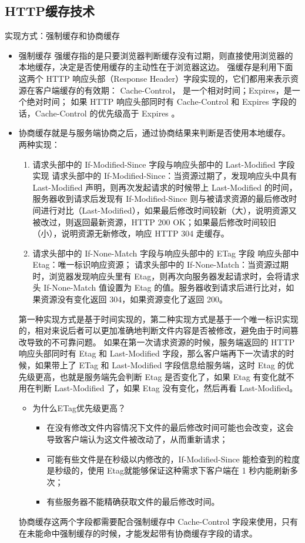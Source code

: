 \documentclass[11pt]{article}
\begin{document}
\subsection{HTTP缓存技术}
\label{sec:org32c3429}
实现方式：强制缓存和协商缓存
\begin{itemize}
\item 强制缓存
强缓存指的是只要浏览器判断缓存没有过期，则直接使用浏览器的本地缓存，决定是否使用缓存的主动性在于浏览器这边。
强缓存是利用下面这两个 HTTP 响应头部（Response Header）字段实现的，它们都用来表示资源在客户端缓存的有效期：
Cache-Control， 是一个相对时间；Expires，是一个绝对时间；
如果 HTTP 响应头部同时有 Cache-Control 和 Expires 字段的话，Cache-Control 的优先级高于 Expires 。

\item 协商缓存就是与服务端协商之后，通过协商结果来判断是否使用本地缓存。
两种实现：
\begin{enumerate}
\item 请求头部中的 If-Modified-Since 字段与响应头部中的 Last-Modified 字段实现
请求头部中的 If-Modified-Since：当资源过期了，发现响应头中具有 Last-Modified 声明，则再次发起请求的时候带上 Last-Modified 的时间，服务器收到请求后发现有 If-Modified-Since 则与被请求资源的最后修改时间进行对比（Last-Modified），如果最后修改时间较新（大），说明资源又被改过，则返回最新资源，HTTP 200 OK；如果最后修改时间较旧（小），说明资源无新修改，响应 HTTP 304 走缓存。

\item 请求头部中的 If-None-Match 字段与响应头部中的 ETag 字段
响应头部中 Etag：唯一标识响应资源；
请求头部中的 If-None-Match：当资源过期时，浏览器发现响应头里有 Etag，则再次向服务器发起请求时，会将请求头 If-None-Match 值设置为 Etag 的值。服务器收到请求后进行比对，如果资源没有变化返回 304，如果资源变化了返回 200。
\end{enumerate}
第一种实现方式是基于时间实现的，第二种实现方式是基于一个唯一标识实现的，相对来说后者可以更加准确地判断文件内容是否被修改，避免由于时间篡改导致的不可靠问题。
如果在第一次请求资源的时候，服务端返回的 HTTP 响应头部同时有 Etag 和 Last-Modified 字段，那么客户端再下一次请求的时候，如果带上了 ETag 和 Last-Modified 字段信息给服务端，这时 Etag 的优先级更高，也就是服务端先会判断 Etag 是否变化了，如果 Etag 有变化就不用在判断 Last-Modified 了，如果 Etag 没有变化，然后再看 Last-Modified。
\begin{itemize}
\item 为什么ETag优先级更高？
\begin{itemize}
\item 在没有修改文件内容情况下文件的最后修改时间可能也会改变，这会导致客户端认为这文件被改动了，从而重新请求；
\item 可能有些文件是在秒级以内修改的，If-Modified-Since 能检查到的粒度是秒级的，使用 Etag就能够保证这种需求下客户端在 1 秒内能刷新多次；
\item 有些服务器不能精确获取文件的最后修改时间。
\end{itemize}
\end{itemize}
协商缓存这两个字段都需要配合强制缓存中 Cache-Control 字段来使用，只有在未能命中强制缓存的时候，才能发起带有协商缓存字段的请求。


\end{itemize}
\end{document}

